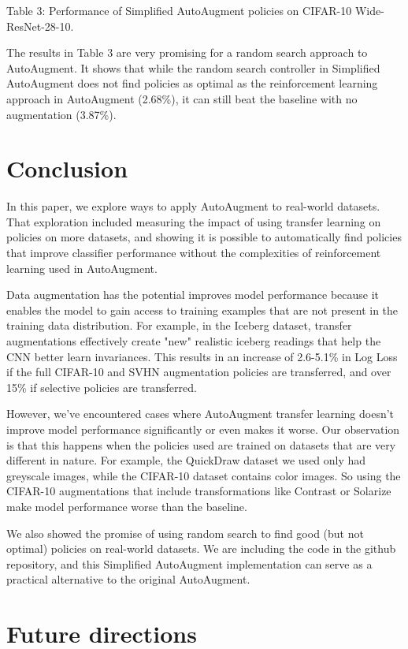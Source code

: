 \documentclass[10pt,twocolumn,letterpaper]{article}
\begin{document}
Table 3: Performance of Simplified AutoAugment policies on CIFAR-10 Wide-ResNet-28-10.

The results in Table 3 are very promising for a random search approach to AutoAugment.  It shows that while the random search controller in Simplified AutoAugment does not find policies as optimal as the reinforcement learning approach in AutoAugment (2.68\%), it can still beat the baseline with no augmentation (3.87\%).   

\section{Conclusion}

In this paper, we explore ways to apply AutoAugment to real-world datasets. That exploration included measuring the impact of using transfer learning on policies on more datasets, and showing it is possible to automatically find policies that improve classifier performance without the complexities of reinforcement learning used in AutoAugment.

Data augmentation has the potential improves model performance because it enables the model to gain access to training examples that are not present in the training data distribution. For example, in the Iceberg dataset, transfer augmentations effectively create "new" realistic iceberg readings that help the CNN better learn invariances.  This results in an increase of 2.6-5.1\% in Log Loss if the full CIFAR-10 and SVHN augmentation policies are transferred, and over 15\% if selective policies are transferred. 

However, we’ve encountered cases where AutoAugment transfer learning doesn’t improve model performance significantly or even makes it worse. Our observation is that this happens when the policies used are trained on datasets that are very different in nature. For example, the QuickDraw dataset we used only had greyscale images, while the CIFAR-10 dataset contains color images. So using the CIFAR-10 augmentations that include transformations like Contrast or Solarize make model performance worse than the baseline.

We also showed the promise of using random search to find good (but not optimal) policies on real-world datasets.  We are including the code in the github repository, and this Simplified AutoAugment implementation can serve as a practical alternative to the original AutoAugment.

\section{Future directions}
\end{document}
